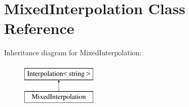 \hypertarget{class_mixed_interpolation}{}\section{Mixed\+Interpolation Class Reference}
\label{class_mixed_interpolation}
Inheritance diagram for Mixed\+Interpolation\+:\begin{figure}[H]
\begin{center}
\leavevmode
\includegraphics[height=2.000000cm]{class_mixed_interpolation}
\end{center}
\end{figure}
